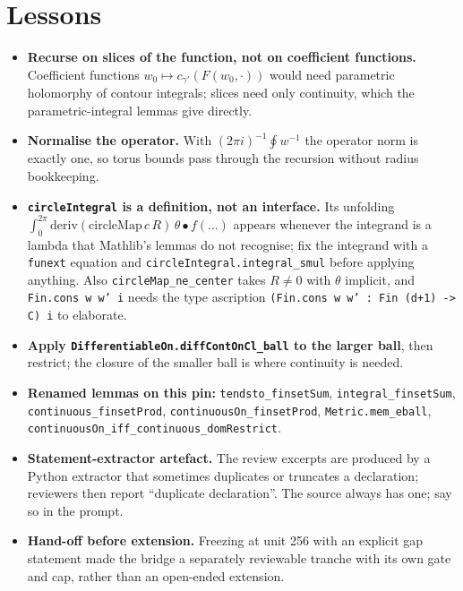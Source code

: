 \documentclass[11pt]{article}
\begin{document}
\section{Lessons}
\begin{itemize}
\item \textbf{Recurse on slices of the function, not on coefficient functions.} Coefficient functions
$w_0\mapsto c_{\gamma'}(F(w_0,\cdot))$ would need parametric holomorphy of contour integrals; slices
need only continuity, which the parametric-integral lemmas give directly.
\item \textbf{Normalise the operator.} With $(2\pi i)^{-1}\oint w^{-1}$ the operator norm is exactly one,
so torus bounds pass through the recursion without radius bookkeeping.
\item \textbf{\texttt{circleIntegral} is a definition, not an interface.} Its unfolding
$\int_0^{2\pi}\mathrm{deriv}(\mathrm{circleMap}\,c\,R)\,\theta\bullet f(\ldots)$ appears whenever the
integrand is a lambda that Mathlib's lemmas do not recognise; fix the integrand with a \texttt{funext}
equation and \texttt{circleIntegral.integral\_smul} before applying anything. Also
\texttt{circleMap\_ne\_center} takes $R\ne0$ with $\theta$ implicit, and \texttt{Fin.cons w w' i} needs the
type ascription \texttt{(Fin.cons w w' : Fin (d+1) -> C) i} to elaborate.
\item \textbf{Apply \texttt{DifferentiableOn.diffContOnCl\_ball} to the larger ball}, then restrict; the
closure of the smaller ball is where continuity is needed.
\item \textbf{Renamed lemmas on this pin:} \texttt{tendsto\_finsetSum}, \texttt{integral\_finsetSum},
\texttt{continuous\_finsetProd}, \texttt{continuousOn\_finsetProd}, \texttt{Metric.mem\_eball},
\texttt{continuousOn\_iff\_continuous\_domRestrict}.
\item \textbf{Statement-extractor artefact.} The review excerpts are produced by a Python extractor that
sometimes duplicates or truncates a declaration; reviewers then report ``duplicate declaration''. The
source always has one; say so in the prompt.
\item \textbf{Hand-off before extension.} Freezing at unit 256 with an explicit gap statement made the
bridge a separately reviewable tranche with its own gate and cap, rather than an open-ended extension.
\end{itemize}
\end{document}
